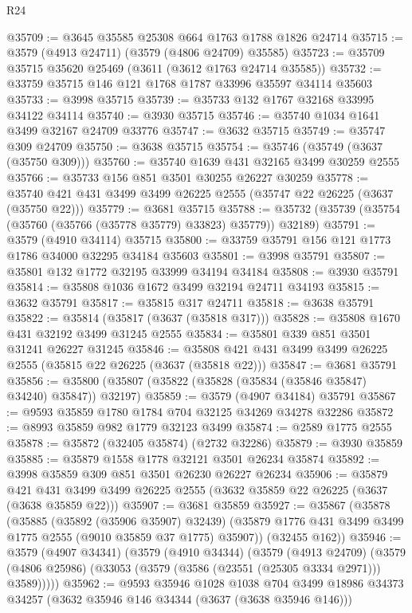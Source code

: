 \begin{lexlean}{R24}
\begin{coremodule}
@35709 := @3645 @35585 @25308 @664 @1763 @1788 @1826 @24714
@35715 := @3579 (@4913 @24711) (@3579 (@4806 @24709) @35585)
@35723 := @35709 @35715 @35620 @25469 (@3611 (@3612 @1763 @24714 @35585))
@35732 := @33759 @35715 @146 @121 @1768 @1787 @33996 @35597 @34114 @35603
@35733 := @3998 @35715
@35739 := @35733 @132 @1767 @32168 @33995 @34122 @34114
@35740 := @3930 @35715
@35746 := @35740 @1034 @1641 @3499 @32167 @24709 @33776
@35747 := @3632 @35715
@35749 := @35747 @309 @24709
@35750 := @3638 @35715
@35754 := @35746 (@35749 (@3637 (@35750 @309)))
@35760 := @35740 @1639 @431 @32165 @3499 @30259 @2555
@35766 := @35733 @156 @851 @3501 @30255 @26227 @30259
@35778 := @35740 @421 @431 @3499 @3499 @26225 @2555 (@35747 @22 @26225 (@3637 (@35750 @22)))
@35779 := @3681 @35715
@35788 := @35732 (@35739 (@35754 (@35760 (@35766 (@35778 @35779) @33823) @35779)) @32189)
@35791 := @3579 (@4910 @34114) @35715
@35800 := @33759 @35791 @156 @121 @1773 @1786 @34000 @32295 @34184 @35603
@35801 := @3998 @35791
@35807 := @35801 @132 @1772 @32195 @33999 @34194 @34184
@35808 := @3930 @35791
@35814 := @35808 @1036 @1672 @3499 @32194 @24711 @34193
@35815 := @3632 @35791
@35817 := @35815 @317 @24711
@35818 := @3638 @35791
@35822 := @35814 (@35817 (@3637 (@35818 @317)))
@35828 := @35808 @1670 @431 @32192 @3499 @31245 @2555
@35834 := @35801 @339 @851 @3501 @31241 @26227 @31245
@35846 := @35808 @421 @431 @3499 @3499 @26225 @2555 (@35815 @22 @26225 (@3637 (@35818 @22)))
@35847 := @3681 @35791
@35856 := @35800 (@35807 (@35822 (@35828 (@35834 (@35846 @35847) @34240) @35847)) @32197)
@35859 := @3579 (@4907 @34184) @35791
@35867 := @9593 @35859 @1780 @1784 @704 @32125 @34269 @34278 @32286
@35872 := @8993 @35859 @982 @1779 @32123 @3499
@35874 := @2589 @1775 @2555
@35878 := @35872 (@32405 @35874) (@2732 @32286)
@35879 := @3930 @35859
@35885 := @35879 @1558 @1778 @32121 @3501 @26234 @35874
@35892 := @3998 @35859 @309 @851 @3501 @26230 @26227 @26234
@35906 := @35879
    @421
    @431
    @3499
    @3499
    @26225
    @2555
    (@3632 @35859 @22 @26225 (@3637 (@3638 @35859 @22)))
@35907 := @3681 @35859
@35927 := @35867
    (@35878
      (@35885
        (@35892 (@35906 @35907) @32439)
        (@35879 @1776 @431 @3499 @3499 @1775 @2555 (@9010 @35859 @37 @1775) @35907))
      (@32455 @162))
@35946 := @3579
    (@4907 @34341)
    (@3579
      (@4910 @34344)
      (@3579
        (@4913 @24709)
        (@3579 (@4806 @25986) (@33053 (@3579 (@3586 (@23551 (@25305 @3334 @2971))) @3589)))))
@35962 := @9593
    @35946
    @1028
    @1038
    @704
    @3499
    @18986
    @34373
    @34257
    (@3632 @35946 @146 @34344 (@3637 (@3638 @35946 @146)))

\end{coremodule}
\end{lexlean}
